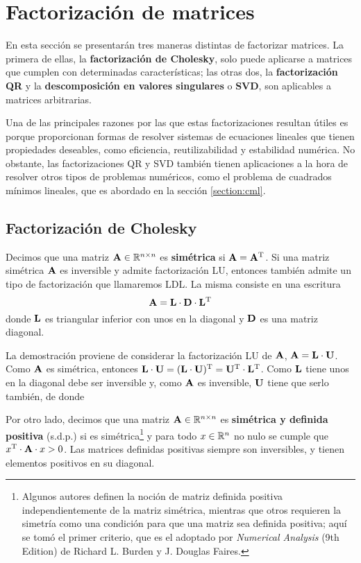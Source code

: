 
\section{Factorización de matrices}
\label{section:factorizacion-matrices}

En esta sección se presentarán tres maneras distintas de factorizar matrices.
La primera de ellas, la \textbf{factorización de Cholesky}, solo puede
aplicarse a matrices que cumplen con determinadas características; las otras
dos, la \textbf{factorización QR} y la \textbf{descomposición en valores
singulares} o \textbf{SVD}, son aplicables a matrices arbitrarias.

Una de las principales razones por las que estas factorizaciones resultan
útiles es porque proporcionan formas de resolver sistemas de ecuaciones
lineales que tienen propiedades deseables, como eficiencia, reutilizabilidad
y estabilidad numérica. No obstante, las factorizaciones QR y SVD también
tienen aplicaciones a la hora de resolver otros tipos de problemas numéricos,
como el problema de cuadrados mínimos lineales, que es abordado en la
sección \ref{section:cml}.

\subsection{Factorización de Cholesky}

Decimos que una matriz $\mathbf{A} \in \mathbb{R}^{n \times n}$ es
\textbf{simétrica} si $\mathbf{A} = \mathbf{A}^{\mathrm{T}}$.
Si una matriz simétrica $\mathbf{A}$ es inversible y admite factorización LU,
entonces también admite un tipo de factorización que llamaremos LDL.
La misma consiste en una escritura
\[ \mathbf{A} = \mathbf{L} \cdot \mathbf{D} \cdot \mathbf{L}^{\mathrm{T}} \]
donde $\mathbf{L}$ es triangular inferior con unos en la diagonal y $\mathbf{D}$
es una matriz diagonal.

La demostración proviene de considerar la factorización LU de $\mathbf{A}$,
$\mathbf{A} = \mathbf{L} \cdot \mathbf{U}$. Como $\mathbf{A}$ es simétrica, entonces
$\mathbf{L} \cdot \mathbf{U} = (\mathbf{L} \cdot \mathbf{U})^{\mathrm{T}} =
\mathbf{U}^{\mathrm{T}} \cdot \mathbf{L}^{\mathrm{T}}$. Como $\mathbf{L}$ tiene unos en la diagonal
debe ser inversible y, como $\mathbf{A}$ es inversible, $\mathbf{U}$ tiene que
serlo también, de donde %


Por otro lado, decimos que una matriz $\mathbf{A} \in \mathbb{R}^{n \times n}$
es \textbf{simétrica y definida positiva} (s.d.p.) si es
simétrica\footnote{Algunos autores definen la noción de matriz definida
positiva independientemente de la matriz simétrica, mientras que otros
requieren la simetría como una condición para que una matriz sea definida
positiva; aquí se tomó el primer criterio, que es el adoptado por
\emph{Numerical Analysis} (9th Edition) de Richard L. Burden y J. Douglas
Faires.}
y para todo $x \in \mathbb{R}^{n}$ no nulo se cumple que
$x^{\mathrm{T}} \cdot \mathbf{A} \cdot x > 0$. Las matrices definidas positivas siempre son inversibles, y tienen elementos positivos en su diagonal.

